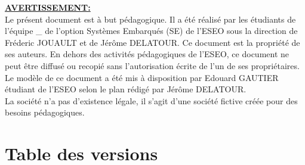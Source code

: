 \documentclass[a4paper,11pt,titlepage]{article}
\author{B2\_2024}        %
\title{\documentName}     %
\date{\normalsize\today}    %
\begin{document}
\maketitle

\setcounter{page}{1}
\vspace*{\fill}
\noindent
\underline{\textbf{AVERTISSEMENT:}} \\
Le présent document est à but pédagogique. Il a été réalisé par les étudiants {\teamMembers} de l'équipe \teamNumber\_{\graduationYear} de l'option Systèmes Embarqués (SE) de l’ESEO sous la direction de Fréderic JOUAULT et de Jérôme DELATOUR. Ce document est la propriété de ses auteurs. En dehors des activités pédagogiques de l'ESEO, ce document ne peut être diffusé ou recopié sans l’autorisation écrite de l'un de ses propriétaires. \\
Le modèle de ce document a été mis à disposition par Edouard GAUTIER étudiant de l'ESEO selon le plan rédigé par Jérôme DELATOUR. \\ 
La société {\teamCompany} n’a pas d’existence légale, il s’agit d'une société fictive créée pour des besoins pédagogiques.
\vspace*{\fill}
\clearpage

\section*{Table des versions}
 \label{Table des versions} %
\clearpage

\tableofcontents %












\listoffigures \label{TableOfFigure} %
\end{document}
